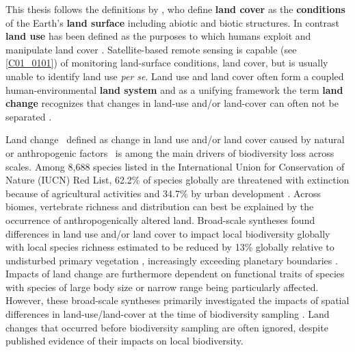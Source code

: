   \vspace{-20pt}
  \begin{center}
        \begin{definitions}[Definitions]
        This thesis follows the definitions by \cite{Lambin2006}, who define \textbf{land cover} as the \textbf{conditions} of the Earth’s \textbf{land surface} including abiotic and biotic structures. In contrast \textbf{land use} has been defined as the purposes to which humans exploit and manipulate land cover \citep{Lambin2006}. Satellite-based remote sensing is capable (see \ref{C01_0101}) of monitoring land-surface conditions, \ie land cover, but is usually unable to identify land use \textit{per se}. Land use and land cover often form a coupled human-environmental \textbf{land system} \citep{Lambin2006,Turner2007} and as a unifying framework the term \textbf{land change} recognizes that changes in land-use and/or land-cover can often not be separated \citep{Turner2007,Lambin2006}.
        \end{definitions}  
  \end{center}
  \vspace{-20pt}

Land change \textendash\ defined as change in land use and/or land cover caused by natural or anthropogenic factors \citep[Box 1.1, ][]{Lambin2003,Turner2007,Song2018} \textendash\ is among the main drivers of biodiversity loss across scales. Among 8,688 species listed in the International Union for Conservation of Nature (IUCN) Red List, 62.2\% of species globally are threatened with extinction because of agricultural activities and 34.7\% by urban development \citep{Maxwell2016}. Across biomes, vertebrate richness \citep{Brum2013,Kehoe2017} and distribution \citep{DiMarco2015} can best be explained by the occurrence of anthropogenically altered land. Broad-scale syntheses found differences in land use and/or land cover to impact local biodiversity globally \citep{Gibson2011,Murphy2014,Newbold2014b,Newbold2015,Alroy2017} with local species richness estimated to be reduced by 13\% globally relative to undisturbed primary vegetation \citep{Newbold2015}, increasingly exceeding planetary boundaries \citep{Newbold2016a}. Impacts of land change are furthermore dependent on functional traits of species \citep{Newbold2013,Jung2016} with species of large body size \citep{Newbold2013,Newbold2015} or narrow range \citep{Newbold2018} being particularly affected. However, these broad-scale syntheses primarily investigated the impacts of spatial differences in land-use/land-cover at the time of biodiversity sampling \citep{Gibson2011,Murphy2014,Newbold2015,Alroy2017}. Land changes that occurred before biodiversity sampling are often ignored, despite published evidence of their impacts on local biodiversity.

